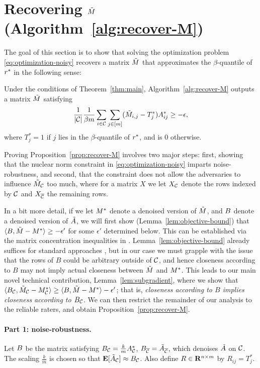 \section{Recovering $\tilde{M}$ (Algorithm~\ref{alg:recover-M})}
\label{sec:approach-M}

The goal of this section is to show that solving the optimization 
problem \eqref{eq:optimization-noisy} recovers a matrix $\tilde{M}$ that 
approximates the $\beta$-quantile of $r^*$ in the following sense:
\begin{proposition}
\label{prop:recover-M}
Under the conditions of Theorem~\ref{thm:main}, Algorithm~\ref{alg:recover-M} 
outputs a matrix $\tilde{M}$ satisfying 
\[ \frac{1}{|\mathcal{C}|} \frac{1}{\beta m} \sum_{i \in \mathcal{C}} \sum_{j \in [m]} (\tilde{M}_{i,j}-T^*_j)A^*_{ij} \geq -\epsilon, \]
where $T^*_j = 1$ if $j$ lies in the $\beta$-quantile of $r^*$, and is $0$ otherwise.
\end{proposition}
Proving Proposition~\ref{prop:recover-M} involves two major steps: first, 
showing that the nuclear norm constraint in \eqref{eq:optimization-noisy} 
imparts noise-robustness, and second, that the constraint does not allow 
the adversaries to influence $\tilde{M}_{\mathcal{C}}$ too much, where for a matrix $X$ 
we let $X_{\mathcal{C}}$ denote the rows indexed by $\mathcal{C}$ and $X_{\overline{\mathcal{C}}}$ the remaining rows.

In a bit 
more detail, if we let $M^*$ denote a denoised version of $\tilde{M}$, and $B$ 
denote a denoised version of $\tilde{A}$, we will first show 
(Lemma~\ref{lem:objective-bound}) that 
$\langle B, \tilde{M} - M^* \rangle \geq -\epsilon'$ for some $\epsilon'$ 
determined below. This can be established via the matrix concentration 
inequalities in \citet{le2015concentration}. Lemma~\ref{lem:objective-bound} already 
suffices for standard approaches \citep[e.g.][]{guedon2014community}, 
but in our case we must grapple with the issue that the rows of $B$ could be 
arbitrary outside of $\mathcal{C}$, and hence closeness according to $B$ may not 
imply actual closeness between $\tilde{M}$ and $M^*$. This leads to our main 
novel technical contribution, Lemma~\ref{lem:subgradient}, where we show 
that $\langle B_{\mathcal{C}}, \tilde{M}_{\mathcal{C}} - M^*_{\mathcal{C}} \rangle \geq \langle B, \tilde{M} - M^* \rangle - \epsilon'$; 
that is, \emph{closeness according to $B$ implies closeness according to 
$B_{\mathcal{C}}$}. We can then restrict the remainder of our analysis to the 
reliable raters, and obtain Proposition~\ref{prop:recover-M}.

\paragraph{Part 1: noise-robustness.} Let $B$ be the matrix satisfying 
$B_{\mathcal{C}} = \frac{k}{m}A^*_{\mathcal{C}}$, $B_{\overline{\mathcal{C}}} = \tilde{A}_{\overline{\mathcal{C}}}$, 
which denoises $\tilde{A}$ on $\mathcal{C}$.
The scaling $\frac{k}{m}$ is chosen so that 
$\mathbf{E}[\tilde{A}_{\mathcal{C}}] \approx B_{\mathcal{C}}$.
Also define $R \in \mathbf{R}^{n \times m}$ by $R_{ij} = T_j^*$.

